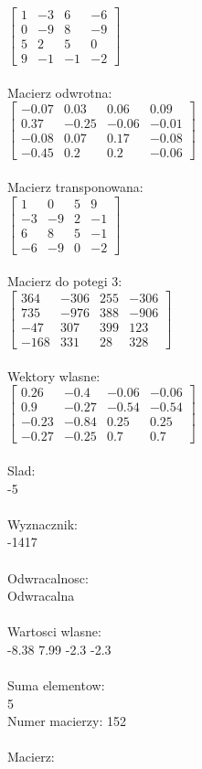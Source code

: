 \documentclass[a4paper,12pt]{article}
\begin{document}
$\begin{bmatrix} 1&-3&6&-6\\0&-9&8&-9\\5&2&5&0\\9&-1&-1&-2 \end{bmatrix}$
\\
\\
Macierz odwrotna:\\

$\begin{bmatrix} -0.07&0.03&0.06&0.09\\0.37&-0.25&-0.06&-0.01\\-0.08&0.07&0.17&-0.08\\-0.45&0.2&0.2&-0.06 \end{bmatrix}$
\\
\\
Macierz transponowana:\\

$\begin{bmatrix} 1&0&5&9\\-3&-9&2&-1\\6&8&5&-1\\-6&-9&0&-2 \end{bmatrix}$
\\
\\
Macierz do potegi 3:\\

$\begin{bmatrix} 364&-306&255&-306\\735&-976&388&-906\\-47&307&399&123\\-168&331&28&328 \end{bmatrix}$
\\
\\
Wektory wlasne:\\

$\begin{bmatrix} 0.26&-0.4&-0.06&-0.06\\0.9&-0.27&-0.54&-0.54\\-0.23&-0.84&0.25&0.25\\-0.27&-0.25&0.7&0.7 \end{bmatrix}$
\\
\\
Slad:\\
-5
\\
\\
Wyznacznik:\\
-1417
\\
\\
Odwracalnosc:\\
Odwracalna
\\
\\
Wartosci wlasne:\\
-8.38 7.99 -2.3 -2.3
\\
\\
Suma elementow:\\
5
\\
\newpage
Numer macierzy:
152
\\
\\
Macierz:\\
\end{document}
